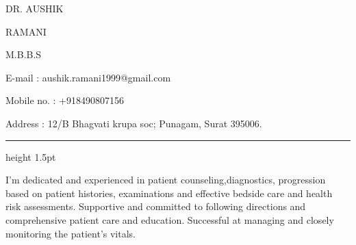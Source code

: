 \documentclass[10pt,a4paper]{article}
\newcommand{\mregular}{\fontseries{m}\selectfont}
\newcommand{\mbold}{\fontseries{b}\selectfont}
\newcommand{\mblack}{\fontseries{bx}\selectfont}
\begin{document}
\begin{minipage}[t]{0.51\textwidth}
  \vspace{0pt}
  {\fontsize{32}{32}\selectfont\mblack DR. AUSHIK\par}
  \vspace{2pt}
  {\fontsize{32}{32}\selectfont\mblack RAMANI\par}
  \vspace{10pt}
  {\fontsize{14}{16}\selectfont\mbold M.B.B.S\par}
\end{minipage}%
\hfill
\begin{minipage}[t]{0.425\textwidth}
  \vspace{0pt}
  {\fontsize{9.5}{13}\selectfont\mregular
    E-mail : aushik.ramani1999@gmail.com\par
    Mobile no. : +918490807156\par
    Address : 12/B Bhagvati krupa soc; Punagam, Surat 395006.\par
  }
\end{minipage}

\vspace{3mm}
\hrule height 1.5pt
\vspace{2mm}

{\fontsize{9.5}{12.5}\selectfont\mregular\justifying\noindent
I'm dedicated and experienced in patient counseling,diagnostics, progression based on patient
histories, examinations and effective bedside care and health risk assessments. Supportive and
committed to following directions and comprehensive patient care and education. Successful at
managing and closely monitoring the patient's vitals.\par}

\vspace{1.5mm}
\end{document}
